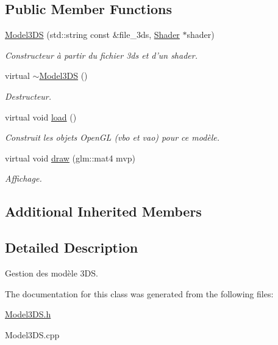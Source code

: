 \subsection*{Public Member Functions}
\begin{DoxyCompactItemize}
\item 
\hypertarget{classModel3DS_ad40489eb8948fbc5e838333763ed8729}{\hyperlink{classModel3DS_ad40489eb8948fbc5e838333763ed8729}{Model3\-D\-S} (std\-::string const \&file\-\_\-3ds, \hyperlink{classShader}{Shader} $\ast$shader)}\label{classModel3DS_ad40489eb8948fbc5e838333763ed8729}

\begin{DoxyCompactList}\small\item\em Constructeur à partir du fichier 3ds et d'un shader. \end{DoxyCompactList}\item 
\hypertarget{classModel3DS_a87eb706e70138a70745fa866246f24e0}{virtual \hyperlink{classModel3DS_a87eb706e70138a70745fa866246f24e0}{$\sim$\-Model3\-D\-S} ()}\label{classModel3DS_a87eb706e70138a70745fa866246f24e0}

\begin{DoxyCompactList}\small\item\em Destructeur. \end{DoxyCompactList}\item 
\hypertarget{classModel3DS_ad583f00b00866b9b94a352babdf3944a}{virtual void \hyperlink{classModel3DS_ad583f00b00866b9b94a352babdf3944a}{load} ()}\label{classModel3DS_ad583f00b00866b9b94a352babdf3944a}

\begin{DoxyCompactList}\small\item\em Construit les objets Open\-G\-L (vbo et vao) pour ce modèle. \end{DoxyCompactList}\item 
\hypertarget{classModel3DS_ad9566a257fe27a740ee44b1cedbedcd1}{virtual void \hyperlink{classModel3DS_ad9566a257fe27a740ee44b1cedbedcd1}{draw} (glm\-::mat4 mvp)}\label{classModel3DS_ad9566a257fe27a740ee44b1cedbedcd1}

\begin{DoxyCompactList}\small\item\em Affichage. \end{DoxyCompactList}\end{DoxyCompactItemize}
\subsection*{Additional Inherited Members}


\subsection{Detailed Description}
Gestion des modèle 3\-D\-S. 

The documentation for this class was generated from the following files\-:\begin{DoxyCompactItemize}
\item 
\hyperlink{Model3DS_8h}{Model3\-D\-S.\-h}\item 
Model3\-D\-S.\-cpp\end{DoxyCompactItemize}
